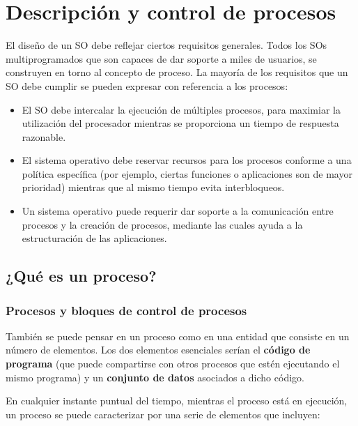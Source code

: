 \documentclass{article}
\begin{document}
				
	\section{Descripción y control de procesos}
		El diseño de un SO debe reflejar ciertos requisitos generales. Todos los SOs multiprogramados que son capaces de dar soporte a miles de usuarios, se construyen en torno al concepto de proceso. La mayoría de los requisitos que un SO debe cumplir se pueden expresar con referencia a los procesos: 
		
		\begin{itemize}
		\item El SO debe intercalar la ejecución de múltiples procesos, para maximiar la utilización del procesador mientras se proporciona un tiempo de respuesta razonable.
		\item El sistema operativo debe reservar recursos para los procesos conforme a una política específica (por ejemplo, ciertas funciones o aplicaciones son de mayor prioridad) mientras que al mismo tiempo evita interbloqueos.
		\item Un sistema operativo puede requerir dar soporte a la comunicación entre procesos y la creación de procesos, mediante las cuales ayuda a la estructuración de las aplicaciones.
		\end{itemize}
		
		\subsection{¿Qué es un proceso?}
			\subsubsection{Procesos y bloques de control de procesos}
				También se puede pensar en un proceso como en una entidad que consiste en un número de elementos. Los dos elementos esenciales serían el \textbf{código de programa} (que puede compartirse con
otros procesos que estén ejecutando el mismo programa) y un \textbf{conjunto de datos} asociados a dicho código.
				
				En cualquier instante puntual del tiempo, mientras el proceso está en ejecución, un proceso se puede caracterizar por una serie de elementos que incluyen:
				
\end{document}
